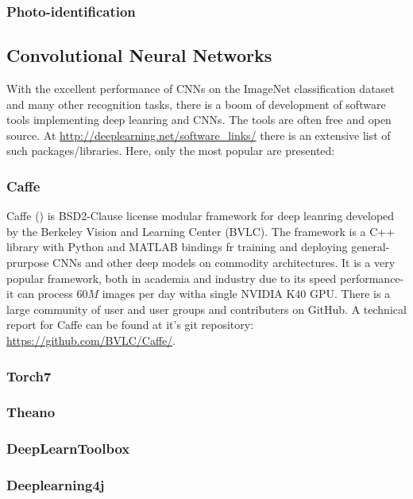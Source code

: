 \subsubsection{Photo-identification}


\subsection{Convolutional Neural Networks}
With the excellent performance of CNNs on the ImageNet classification dataset and many other recognition tasks, there is a boom of development of software tools implementing deep leanring and CNNs. 
The tools are often free and open source. At \url{http://deeplearning.net/software_links/} there is an extensive list of such packages/libraries. Here, only the most popular are presented:
\subsubsection{Caffe}
Caffe (\cite{caffe_soft}) is BSD2-Clause license modular framework for deep leanring developed by the Berkeley Vision and Learning Center (BVLC). The framework is a C++ library with Python and MATLAB bindings fr training and deploying general-prurpose CNNs and other deep models on commodity architectures. It is a very popular framework, both in academia and industry due to its speed performance- it can process $60M$ images per day witha single NVIDIA K40 GPU. There is a large community of user and user groups and contributers on GitHub. A technical report for Caffe can be found at it's git repository: \url{https://github.com/BVLC/Caffe/}.
\subsubsection{Torch7}
\subsubsection{Theano}
\subsubsection{DeepLearnToolbox}
\subsubsection{Deeplearning4j}
